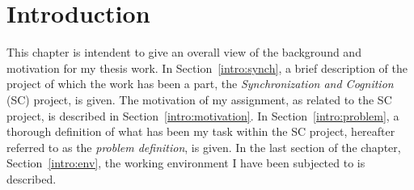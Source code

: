 
\cleardoublepage
\chapter{Introduction}
\label{intro}

This chapter is intendent to give an overall view of the background
and motivation for my thesis work.  In Section~\ref{intro:synch}, a
brief description of the project of which the work has been a part,
the {\em Synchronization and Cognition\/} (SC) project, is given.  The
motivation of my assignment, as related to the SC project, is
described in Section~\ref{intro:motivation}.  In
Section~\ref{intro:problem}, a thorough definition of what has been my
task within the SC project, hereafter referred to as the {\em problem
  definition\/}, is given.  In the last section of the chapter,
Section~\ref{intro:env}, the working environment I have been subjected
to is described.





